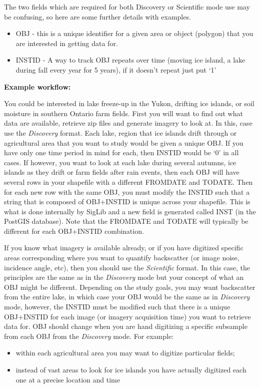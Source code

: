 \documentclass[letterpaper,10pt,english]{sphinxmanual}
\begin{document}
The two fields which are required for both Discovery or Scientific mode
use may be confusing, so here are some further details with examples.
\begin{itemize}
\item {} 
OBJ - this is a unique identifier for a given area or object
(polygon) that you are interested in getting data for.

\item {} 
INSTID - A way to track OBJ repeats over time (moving ice island, a
lake during fall every year for 5 years), if it doesn't repeat just
put `1'

\end{itemize}

\textbf{Example workflow:}

You could be interested in lake freeze-up in the Yukon, drifting ice
islands, or soil moisture in southern Ontario farm fields. First you
will want to find out what data are available, retrieve zip files and
generate imagery to look at. In this, case use the \emph{Discovery} format.
Each lake, region that ice islands drift through or agricultural area
that you want to study would be given a unique OBJ. If you have only one
time period in mind for each, then INSTID would be `0' in all cases. If
however, you want to look at each lake during several autumns, ice
islands as they drift or farm fields after rain events, then each OBJ
will have several rows in your shapefile with a different FROMDATE and
TODATE. Then for each new row with the same OBJ, you must modify the
INSTID such that a string that is composed of OBJ+INSTID is unique
across your shapefile. This is what is done internally by SigLib and a
new field is generated called INST (in the PostGIS database). Note that
the FROMDATE and TODATE will typically be different for each OBJ+INSTID
combination.

If you know what imagery is available already, or if you have digitized
specific areas corresponding where you want to quantify backscatter (or
image noise, incidence angle, etc), then you should use the \emph{Scientific}
format. In this case, the principles are the same as in the \emph{Discovery}
mode but your concept of what an OBJ might be different. Depending on
the study goals, you may want backscatter from the entire lake, in which
case your OBJ would be the same as in \emph{Discovery} mode, however, the
INSTID must be modified such that there is a unique OBJ+INSTID for each
image (or imagery acquisition time) you want to retrieve data for. OBJ
should change when you are hand digitizing a specific subsample from
each OBJ from the \emph{Discovery} mode. For example:
\begin{itemize}
\item {} 
within each agricultural area you may want to digitize particular
fields;

\item {} 
instead of vast areas to look for ice islands you have actually
digitized each one at a precise location and time

\end{itemize}
\end{document}
